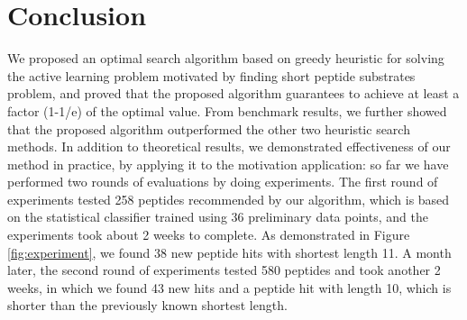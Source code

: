 \documentclass[opre,nonblindrev]{informs3} %
\begin{document}
\section{Conclusion}
We proposed an optimal search algorithm based on greedy heuristic for solving the active learning problem motivated by finding short peptide substrates problem, and proved that the proposed algorithm guarantees to achieve at least a factor (1-1/e) of the optimal value. From benchmark results, we further showed that the proposed algorithm outperformed the other two heuristic search methods. In addition to theoretical results, we demonstrated effectiveness of our method in practice, by applying it to the motivation application: so far we have performed two rounds of evaluations by doing experiments. The first round of experiments tested 258 peptides recommended by our algorithm, which is based on the statistical classifier trained using 36 preliminary data points, and the experiments took about 2 weeks to complete. As demonstrated in Figure \ref{fig:experiment}, we found 38 new peptide hits with shortest length 11. A month later, the second round of experiments tested 580 peptides and took another 2 weeks, in which we found 43 new hits and a peptide hit with length 10, which is shorter than the previously known shortest length. 
%
\end{document}
